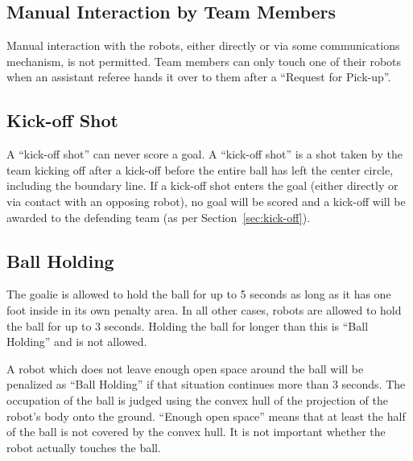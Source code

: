 \documentclass[12pt]{article}
\begin{document}
\subsection{Manual Interaction by Team Members}

Manual interaction with the robots, either directly or via some communications mechanism, is not permitted. Team members can only touch one of their robots when an assistant referee hands it over to them after a ``Request for Pick-up''.

\subsection{Kick-off Shot}
\label{sec:kick-off_shot}

A ``kick-off shot'' can never score a goal. A ``kick-off shot'' is a shot taken by the team kicking off after a kick-off before the entire ball has left the center circle, including the boundary line. If a kick-off shot enters the goal (either directly or via contact with an opposing robot), no goal will be scored and a kick-off will be awarded to the defending team (as per Section~\ref{sec:kick-off}).

\subsection{Ball Holding}
\label{sec:ball_holding}

The goalie is allowed to hold the ball for up to 5 seconds as long as it has one foot inside in its own penalty area. In all other cases, robots are allowed to hold the ball for up to 3 seconds. Holding the ball for longer than this is ``Ball Holding'' and is not allowed.

A robot which does not leave enough open space around the ball will be penalized as ``Ball Holding'' if that situation continues more than 3 seconds. The occupation of the ball is judged using the convex hull of the projection of the robot's body onto the ground. ``Enough open space'' means that at least the half of the ball is not covered by the convex hull. It is not important whether the robot actually touches the ball.
\end{document}
